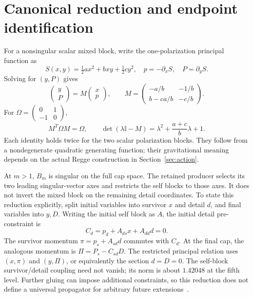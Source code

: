 \documentclass[11pt]{article}
\theoremstyle{remark}\newtheorem{remark}[theorem]{Remark}
\newcommand{\Id}{\mathbb I}
\begin{document}
\section{Canonical reduction and endpoint identification}
\label{sec:canonical}
For a nonsingular scalar mixed block, write the one-polarization principal function as
\begin{equation}
S(x,y)=\tfrac12ax^2+bxy+\tfrac12cy^2,
\quad p=-\partial_xS,\quad P=\partial_yS.
\label{eq:principal}
\end{equation}
Solving for $(y,P)$ gives
\begin{equation}
\begin{pmatrix}y\\P\end{pmatrix}
=M\begin{pmatrix}x\\p\end{pmatrix},\qquad
M=\begin{pmatrix}-a/b&-1/b\\b-ca/b&-c/b\end{pmatrix}.
\label{eq:canonical}
\end{equation}
For $\Omega=\left(\begin{smallmatrix}0&1\\-1&0\end{smallmatrix}\right)$,
\begin{equation}
M^T\Omega M=\Omega,\qquad
\det(\lambda\Id-M)=\lambda^2+\frac{a+c}{b}\lambda+1.
\label{eq:spectrum}
\end{equation}
Each identity holds twice for the two scalar polarization blocks.
They follow from a nondegenerate quadratic generating function; their gravitational meaning depends on the actual Regge construction in Section~\ref{sec:action}.

At $m>1$, $B_m$ is singular on the full cap space.
The retained producer selects its two leading singular-vector axes and restricts the self blocks to those axes.
It does not invert the mixed block on the remaining detail coordinates.
To state this reduction explicitly, split initial variables into survivor $x$ and detail $d$, and final variables into $y,D$.
Writing the initial self block as $A$, the initial detail pre-constraint is
\begin{equation}
C_d=p_d+A_{ds}x+A_{dd}d=0.
\label{eq:preconstraint}
\end{equation}
The survivor momentum $\pi=p_s+A_{sd}d$ commutes with $C_d$.
At the final cap, the analogous momentum is $\Pi=P_s-C_{sd}D$.
The restricted principal relation uses $(x,\pi)$ and $(y,\Pi)$, or equivalently the section $d=D=0$.
The self-block survivor/detail coupling need not vanish; its norm is about $1.42048$ at the fifth level.
Further gluing can impose additional constraints, so this reduction does not define a universal propagator for arbitrary future extensions~\cite{Hoehn2014}.
\end{document}
